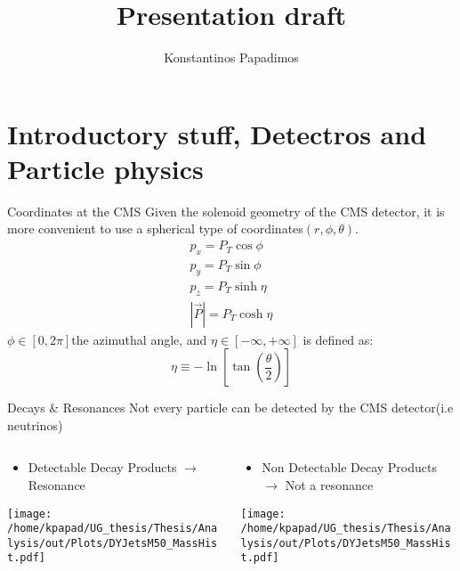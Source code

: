 \documentclass[bigger]{beamer}
\author{Konstantinos Papadimos}
\date{}
\title{Presentation draft}
\begin{document}
\maketitle

\section{Introductory stuff, Detectros and Particle physics}
\label{sec:org796f270}
\begin{frame}[label={sec:org1d83681}]{Coordinates at the CMS}
Given the solenoid geometry of the CMS detector, it is more convenient to use a spherical type of coordinates\(\left(r, \phi, \theta \right)\).
\begin{equation}
\begin{matrix}
p_{x} = P_{T}\cos{\phi} \\
p_{y} = P_{T}\sin{\phi} \\
p_{z} = P_{T}\sinh{\eta}\\
|\vec{P}| = P_{T}\cosh{\eta} 
\end{matrix}
\end{equation}
\(\phi \in \left [ 0, 2\pi \right]\)the azimuthal angle, and \(\eta\in \left [ -\infty, +\infty \right ]\) is defined as:
\begin{equation}
\eta \equiv -\ln{\left [ \tan\left (\frac{\theta}{2} \right ) \right]  }
\end{equation}
\end{frame}

\begin{frame}[label={sec:org400b6e1}]{Decays \& Resonances}
Not every particle can be detected by the CMS detector(i.e neutrinos)
\begin{columns}
\begin{column}{0.5\columnwidth}
\begin{itemize}
\item Detectable Decay Products \(\rightarrow\) Resonance
\end{itemize}
\begin{center}
\texttt{[image: /home/kpapad/UG\_thesis/Thesis/Analysis/out/Plots/DYJetsM50\_MassHist.pdf]}
\end{center}
\end{column}

\begin{column}{0.5\columnwidth}
\begin{itemize}
\item Non Detectable Decay Products \(\rightarrow\) Not a resonance
\end{itemize}
\begin{center}
\texttt{[image: /home/kpapad/UG\_thesis/Thesis/Analysis/out/Plots/DYJetsM50\_MassHist.pdf]}
\end{center}
\end{column}
\end{columns}
\end{frame}
\end{document}
